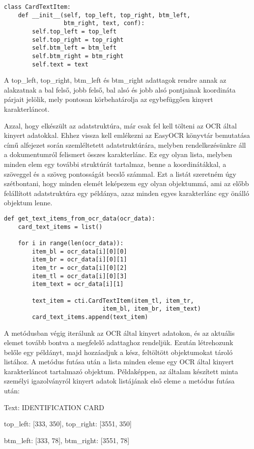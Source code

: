 \documentclass[12pt]{report}
\begin{document}
\begin{verbatim}
class CardTextItem:
    def __init__(self, top_left, top_right, btm_left,
                 btm_right, text, conf):
        self.top_left = top_left
        self.top_right = top_right
        self.btm_left = btm_left
        self.btm_right = btm_right
        self.text = text
\end{verbatim}

A top\_left, top\_right, btm\_left és btm\_right adattagok rendre annak az alakzatnak a bal felső, jobb felső, bal alsó és jobb alsó pontjainak koordináta párjait jelölik, mely pontosan körbehatárolja az egybefüggően kinyert karakterláncot.

Azzal, hogy elkészült az adatstruktúra, már csak fel kell tölteni az OCR által kinyert adatokkal. Ehhez vissza kell emlékezni az EasyOCR könyvtár bemutatása című alfejezet során szemléltetett adatstruktúrára, melyben rendelkezésünkre áll a dokumentumról felismert összes karakterlánc. Ez egy olyan lista, melyben minden elem egy további struktúrát tartalmaz, benne a koordinátákkal, a szöveggel és a szöveg pontosságát becslő számmal. Ezt a listát szeretném úgy szétbontani, hogy minden elemét leképezem egy olyan objektummá, ami az előbb felállított adatstruktúra egy példánya, azaz minden egyes karakterlánc egy önálló objektum lenne.

\begin{verbatim}
def get_text_items_from_ocr_data(ocr_data):
    card_text_items = list()

    for i in range(len(ocr_data)):
        item_bl = ocr_data[i][0][0]
        item_br = ocr_data[i][0][1]
        item_tr = ocr_data[i][0][2]
        item_tl = ocr_data[i][0][3]
        item_text = ocr_data[i][1]

        text_item = cti.CardTextItem(item_tl, item_tr, 
                            item_bl, item_br, item_text)
        card_text_items.append(text_item)
\end{verbatim}

A metódusban végig iterálunk az OCR által kinyert adatokon, és az aktuális elemet tovább bontva a megfelelő adattaghoz rendeljük. Ezután létrehozunk belőle egy példányt, majd hozzáadjuk a kész, feltöltött objektumokat tároló listához. A metódus futása után a lista minden eleme egy OCR által kinyert karakterláncot tartalmazó objektum. Példaképpen, az általam készített minta személyi igazolványról kinyert adatok listájának első eleme a metódus futása után:

\begin{tcolorbox}
    Text: IDENTIFICATION CARD

    top\_left: [333, 350], top\_right: [3551, 350]

    btm\_left: [333, 78], btm\_right: [3551, 78]
\end{tcolorbox}
\end{document}
